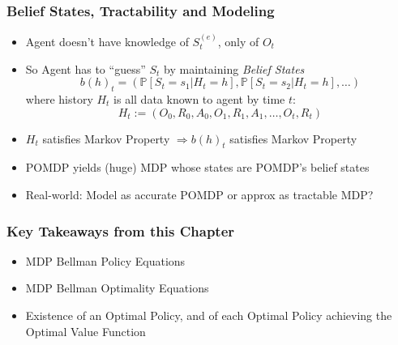 \documentclass[handout]{beamer}
\begin{document}
\begin{frame}
\frametitle{Belief States, Tractability and Modeling}
\pause
\begin{itemize}[<+->]
\item Agent doesn't have knowledge of $S_t^{(e)}$, only of $O_t$
\item So Agent has to ``guess'' $S_t$ by maintaining {\em Belief States}
$$b(h)_t = (\mathbb{P}[S_t=s_1 | H_t = h], \mathbb{P}[S_t = s_2 | H_t = h], \ldots )$$
where history $H_t$ is all data known to agent by time $t$:
$$H_t := (O_0, R_0, A_0, O_1, R_1, A_1, \ldots, O_t, R_t)$$
\item $H_t$ satisfies Markov Property $\Rightarrow  b(h)_t$ satisfies Markov Property
\item POMDP yields (huge) MDP whose states are POMDP's belief states
\item Real-world: Model as accurate POMDP or approx as tractable MDP?
\end{itemize}
\end{frame}

\begin{frame}
\frametitle{Key Takeaways from this Chapter}
\pause
\begin{itemize}[<+->]
\item MDP Bellman Policy Equations
\item MDP Bellman Optimality Equations
\item Existence of an Optimal Policy, and of each Optimal Policy achieving the Optimal Value Function
\end{itemize}
\end{frame}
\end{document}
